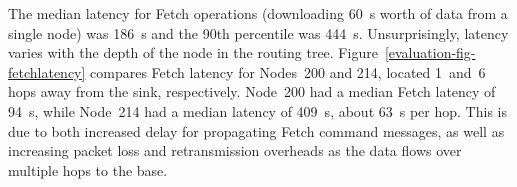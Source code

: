 The median latency for Fetch operations (downloading 60~s worth of data from
a single node) was 186~s and the 90th percentile was 444~s. Unsurprisingly,
latency varies with the depth of the node in the routing tree.
Figure~\ref{evaluation-fig-fetchlatency} compares Fetch latency for Nodes~200
and 214, located 1~and~6 hops away from the sink, respectively. Node~200 had
a median Fetch latency of 94~s, while Node~214 had a median latency of 409~s,
about 63~s per hop. This is due to both increased delay for propagating Fetch
command messages, as well as increasing packet loss and retransmission
overheads as the data flows over multiple hops to the base.
